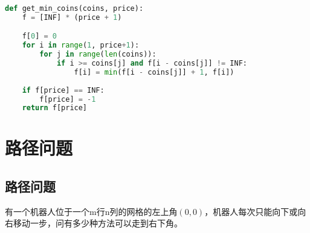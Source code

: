 
\begin{lstlisting}[language=Python]
def get_min_coins(coins, price):
    f = [INF] * (price + 1)

    f[0] = 0
    for i in range(1, price+1):
        for j in range(len(coins)):
            if i >= coins[j] and f[i - coins[j]] != INF:
                f[i] = min(f[i - coins[j]] + 1, f[i])
        
    if f[price] == INF:
        f[price] = -1
    return f[price]
\end{lstlisting}

\newpage

\section{路径问题}

\subsection{路径问题}

有一个机器人位于一个m行n列的网格的左上角$ (0, 0) $，机器人每次只能向下或向右移动一步，问有多少种方法可以走到右下角。 \\

\begin{table}[H]
	\centering
	\caption{起点}
\end{table}

